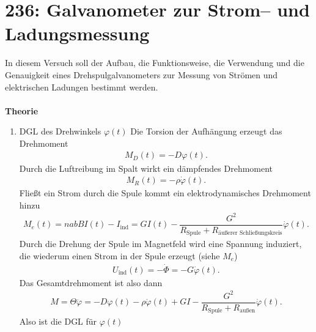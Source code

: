 \section{236: Galvanometer zur Strom-- und Ladungsmessung}
In diesem Versuch soll der Aufbau, die Funktionsweise, die Verwendung und die Genauigkeit eines Drehspulgalvanometers zur Messung von Strömen und elektrischen Ladungen bestimmt werden.\\\\
\textbf{Theorie} 
\begin{enumerate}[label=--]
        \item DGL des Drehwinkels $\varphi \left(t\right)$ \hspace{25pt} 
                Die Torsion der Aufhängung erzeugt das Drehmoment
                \begin{align} 
                        M_D\left(t\right)=-D\varphi \left(t\right)
                .\end{align} 
                Durch die Luftreibung im Spalt wirkt ein dämpfendes Drehmoment
                \begin{align} 
                        M_R\left(t\right)=-\rho \dot{\varphi }\left(t\right)
                .\end{align} 
                Fließt ein Strom durch die Spule kommt ein elektrodynamisches Drehmoment hinzu
                \begin{align} 
                        M_e\left(t\right)=nabBI\left(t\right)-I_{\text{ind}}=GI\left(t\right)-\dfrac{G^2}{R_{\text{Spule}}+R_{\text{äußerer Schließungskreis} }}\dot{\varphi }\left(t\right)
                .\end{align} 
                Durch die Drehung der Spule im Magnetfeld wird eine Spannung induziert, die wiederum einen Strom in der Spule erzeugt (siehe $M_e$) 
                \begin{align} 
                        U_{\text{ind}}\left(t\right)=-\dot{\Phi }=-G\dot{\varphi }\left(t\right)
                .\end{align} 
                Das Gesamtdrehmoment ist also dann
                \begin{align} 
                        M=\Theta \ddot{\varphi }=-D\varphi \left(t\right)-\rho \dot{\varphi }\left(t\right)+GI-\dfrac{G^2}{R_\text{Spule}+R_\text{außen}}\dot{\varphi }\left(t\right)
                .\end{align} 
                Also ist die DGL für $\varphi \left(t\right)$ 
                \begin{align} 

\end{align}
\end{enumerate}
